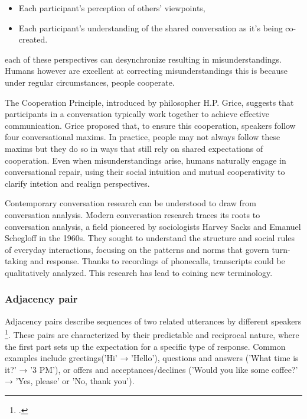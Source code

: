\documentclass[12pt]{report}
\begin{document}
{\begin{itemize}
\begin{itemize}
            \item
            Each participant’s perception of others’ viewpoints,

            \item
            Each participant’s understanding of the shared conversation as it’s being co-created.
        \end{itemize}
\end{itemize}

        each of these perspectives can desynchronize resulting in misunderstandings.
        Humans however are excellent at correcting misunderstandings
        this is because under regular circumstances, people cooperate.

\par
The Cooperation Principle, introduced by philosopher H.P. Grice,
suggests that participants in a conversation typically work together to achieve effective communication.
Grice proposed that, to ensure this cooperation, speakers follow four conversational maxims.
In practice, people may not always follow these maxims
but they do so in ways that still rely on shared expectations of cooperation.
Even when misunderstandings arise,
humans naturally engage in conversational repair,
using their social intuition and mutual cooperativity to clarify intetion and realign perspectives.

\par
Contemporary conversation research can be understood to draw from conversation analysis.
Modern conversation research traces its roots to conversation analysis,
a field pioneered by sociologists Harvey Sacks and Emanuel Schegloff in the 1960s.
They sought to understand the structure and
social rules of everyday interactions,
focusing on the patterns and norms that govern turn-taking and response.
Thanks to recordings of phonecalls,
transcripts could be qualitatively analyzed.
This research has lead to coining new terminology.

    \subsubsection{Adjacency pair}
    \par
    Adjacency pairs describe sequences of two related utterances by different speakers \footcite[p.~188]{Sacks1992}. These pairs are characterized by their predictable and reciprocal nature, where the first part sets up the expectation for a specific type of response. Common examples include greetings('Hi' → 'Hello'), questions and answers ('What time is it?' → '3 PM'), or offers and acceptances/declines ('Would you like some coffee?' → 'Yes, please' or 'No, thank you').

}
\end{document}
